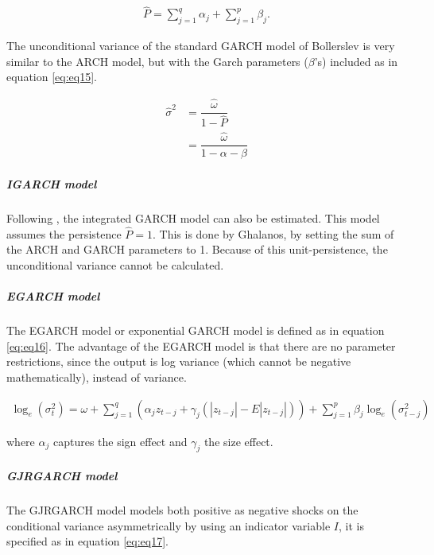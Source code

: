 \documentclass[a4paper, twoside]{templates/ociamthesis}
\begin{document}
\begin{align}
\hat{P} = \sum\limits_{j = 1}^q {{\alpha_j}}  + \sum\limits_{j = 1}^p {{\beta_j}}.
 \label{eq:eq14}
\end{align}

\noindent The unconditional variance of the standard GARCH model of Bollerslev is very similar to the ARCH model, but with the Garch parameters (\(\beta\)'s) included as in equation \eqref{eq:eq15}.

\begin{equation}
\begin{split}
\hat{\sigma}^2 
&= \dfrac{\hat{\omega}}{1 - \hat{P}} \\
&= \dfrac{\hat{\omega}}{1 - \alpha - \beta}
\end{split}
 \label{eq:eq15}
\end{equation}

\hypertarget{igarch-model}{%
\subparagraph{IGARCH model}\label{igarch-model}}

\noindent Following \textcite{ghalanos2020}, the integrated GARCH model \autocite{bollerslev1986} can also be estimated. This model assumes the persistence \(\hat{P} = 1\). This is done by Ghalanos, by setting the sum of the ARCH and GARCH parameters to 1. Because of this unit-persistence, the unconditional variance cannot be calculated.

\newpage

\hypertarget{egarch-model}{%
\subparagraph{EGARCH model}\label{egarch-model}}

\noindent The EGARCH model or exponential GARCH model \autocite{nelson1991} is defined as in equation \eqref{eq:eq16}. The advantage of the EGARCH model is that there are no parameter restrictions, since the output is log variance (which cannot be negative mathematically), instead of variance.

\begin{align}
\log_e(\sigma_t^2) = \omega + \sum\limits_{j=1}^q (\alpha_j z_{t-j} + \gamma_j (|z_{t-j}| - E|z_{t-j}|))+ \sum\limits_{j = 1}^p \beta_j \log_e(\sigma_{t-j}^2)
 \label{eq:eq16}
\end{align}

\noindent where \(\alpha_j\) captures the sign effect and \(\gamma_j\) the size effect.

\hypertarget{gjrgarch-model}{%
\subparagraph{GJRGARCH model}\label{gjrgarch-model}}

\noindent The GJRGARCH model \autocite{glosten1993} models both positive as negative shocks on the conditional variance asymmetrically by using an indicator variable \(I\), it is specified as in equation \eqref{eq:eq17}.
\end{document}
